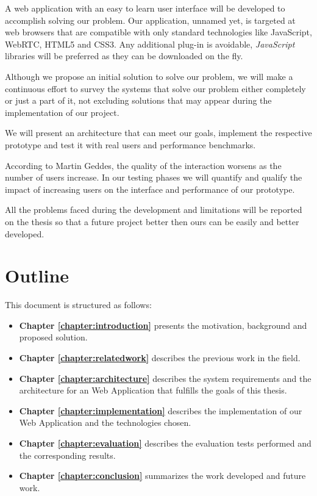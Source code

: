 	A web application with an easy to learn user interface will be developed to accomplish solving our problem. Our application, unnamed yet, is targeted at web browsers that are compatible with only standard technologies like JavaScript, \ac{WebRTC}, \ac{HTML}5 and \ac{CSS}3. Any additional plug-in is avoidable, \emph{JavaScript} libraries will be preferred as they can be downloaded on the fly.  

	Although we propose an initial solution to solve our problem, we will make a continuous effort to survey the systems that solve our problem either completely or just a part of it, not excluding solutions that may appear during the implementation of our project.

	We will present an architecture that can meet our goals, implement the respective prototype and test it with real users and performance benchmarks.

	According to Martin Geddes, the quality of the interaction worsens as the number of users increase\cite{geddes}. In our testing phases we will quantify and qualify the impact of increasing users on the interface and performance of our prototype. 

	All the problems faced during the development and limitations will be reported on the thesis so that a future project better then ours can be easily and better developed.



\section{Outline}

This document is structured as follows:

\begin{itemize}
\item \textbf{Chapter \ref{chapter:introduction}} presents the motivation, background and proposed solution.
\item \textbf{Chapter \ref{chapter:relatedwork}} describes the previous work in the field.
\item \textbf{Chapter \ref{chapter:architecture}} describes the system requirements and the architecture for an Web Application that fulfills the goals of this thesis.
\item \textbf{Chapter \ref{chapter:implementation}} describes the implementation of our Web Application and the technologies chosen.
\item \textbf{Chapter \ref{chapter:evaluation}} describes the evaluation tests performed and the corresponding results.
\item \textbf{Chapter \ref{chapter:conclusion}} summarizes the work developed and future work.
\end{itemize}

\cleardoublepage
